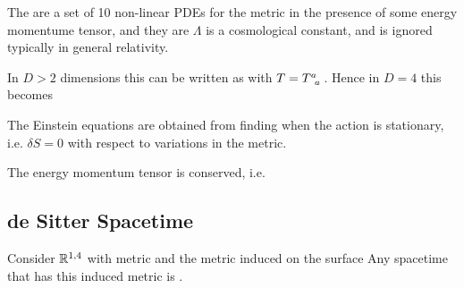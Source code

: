 \documentclass{article}
\begin{document}
\begin{definition}
The  are a set of 10 non-linear PDEs for the metric in the presence of some energy momentume tensor, and they are 
$\Lambda$ is a cosmological constant, and is ignored typically in general relativity. 
\end{definition}

\begin{prop}
In $D>2$ dimensions this can be written as 
with $T=T\indices{^a_a}$. Hence 
in $D=4$ this becomes 
\end{prop}

\begin{theorem}
The Einstein equations are obtained from finding when the action 
is stationary, i.e. $\delta S = 0$ with respect to variations in the metric. 
\end{theorem}

\begin{prop}
\end{prop}
\begin{corollary}
The energy momentum tensor is conserved, i.e. 
\end{corollary}
\subsection{de Sitter Spacetime}

\begin{definition}
Consider $\mathbb{R}^{1,4}$ with metric 
and the metric induced on the surface 
Any spacetime that has this induced metric is .
\end{definition}
\end{document}
